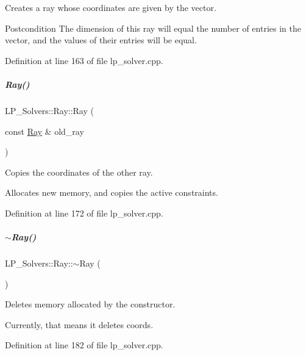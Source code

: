 Creates a ray whose coordinates are given by the vector. 

\begin{DoxyPostcond}{Postcondition}
The dimension of this ray will equal the number of entries in the vector, and the values of their entries will be equal. 
\end{DoxyPostcond}


Definition at line 163 of file lp\+\_\+solver.\+cpp.

\mbox{\label{group___c_l_s_solvers_a3a98b2f969408ba0fa58b46a3dccb9bf}} 
\subparagraph{\texorpdfstring{Ray()}{Ray()}\hspace{0.1cm}{\footnotesize\ttfamily [5/5]}}
{\footnotesize\ttfamily L\+P\+\_\+\+Solvers\+::\+Ray\+::\+Ray (\begin{DoxyParamCaption}\item[{const \hyperlink{group___c_l_s_solvers_class_l_p___solvers_1_1_ray}{Ray} \&}]{old\+\_\+ray }\end{DoxyParamCaption})}



Copies the coordinates of the other ray. 

Allocates new memory, and copies the active constraints. 

Definition at line 172 of file lp\+\_\+solver.\+cpp.

\mbox{\label{group___c_l_s_solvers_a4819e44c9151ea96204a5ca5233646f6}} 
\subparagraph{\texorpdfstring{$\sim$\+Ray()}{~Ray()}}
{\footnotesize\ttfamily L\+P\+\_\+\+Solvers\+::\+Ray\+::$\sim$\+Ray (\begin{DoxyParamCaption}{ }\end{DoxyParamCaption})}



Deletes memory allocated by the constructor. 

Currently, that means it deletes {\ttfamily coords}. 

Definition at line 182 of file lp\+\_\+solver.\+cpp.



